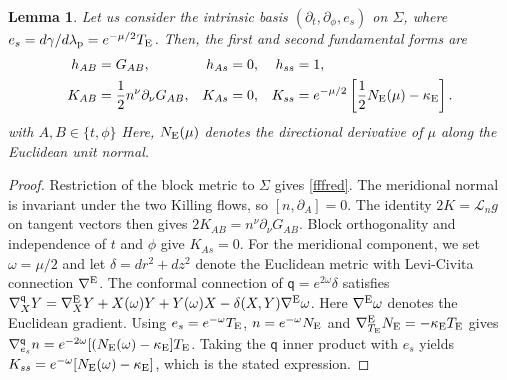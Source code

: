 \documentclass[amsmath,amsfonts,amssymb,aps,pra,superscriptaddress,10pt]{revtex4-2}
\numberwithin{equation}{section}
\theoremstyle{plain}
\newtheorem{lemma}{Lemma}
\theoremstyle{definition}
\theoremstyle{remark}
\theoremstyle{definition}
\begin{document}
\begin{lemma}\label{symmredbd}
Let us consider the intrinsic basis $(\partial_t,\partial_\phi,e_s)$ on $\Sigma$, where $e_s=d\gamma/d\lambda_{\rm{p}}=e^{-\mu/2}T_{\rm{E}}$. Then, the first and second fundamental forms are
\begin{align}
h_{AB}&=G_{AB},&h_{As}&=0,&h_{ss}&=1,\label{fffred}\\
K_{AB}&=\frac{1}{2}n^\nu\partial_\nu G_{AB},&K_{As}&=0,&
K_{ss}&=e^{-\mu/2}\left[\frac{1}{2}N_{\rm{E}}(\mu)-\kappa_{\rm{E}}\right].
\label{bdsf}
\end{align}
with $A,B\in\{t,\phi\}$ Here, $N_{\rm{E}}(\mu)$ denotes the directional derivative of $\mu$ along the Euclidean unit normal.
\end{lemma}

\begin{proof}
Restriction of the block metric to $\Sigma$ gives \eqref{fffred}. The meridional normal is invariant under the two Killing flows, so $[n,\partial_A]=0$. The identity $2K=\mathcal{L}_n g$ on tangent vectors then gives $2K_{AB}=n^\nu\partial_\nu G_{AB}$. Block orthogonality and independence of $t$ and $\phi$ give $K_{As}=0$. For the meridional component, we set $\omega=\mu/2$ and let $\delta=dr^2+dz^2$ denote the Euclidean metric with Levi-Civita connection $\nabla^{\rm{E}}$. The conformal connection of $\mathsf{q}=e^{2\omega}\delta$ satisfies
$\nabla^{\mathsf{q}}_X Y=\nabla^{\rm{E}}_X Y+X(\omega)Y+Y(\omega)X-\delta(X,Y)\nabla^{\rm{E}}\omega$. Here $\nabla^{\rm{E}}\omega$ denotes the Euclidean gradient. Using $e_s=e^{-\omega}T_{\rm{E}}$, $n=e^{-\omega}N_{\rm{E}}$ and $\nabla^{\rm{E}}_{T_{\rm{E}}}N_{\rm{E}}=-\kappa_{\rm{E}}T_{\rm{E}}$ gives $\nabla^{\mathsf{q}}_{e_s}n=e^{-2\omega}[(N_{\rm{E}}(\omega)-\kappa_{\rm{E}}]T_{\rm{E}}$. Taking the $\mathsf{q}$ inner product with $e_s$ yields $K_{ss}=e^{-\omega}[N_{\rm{E}}(\omega)-\kappa_{\rm{E}}]$, which is the stated expression.
\end{proof}
\end{document}
